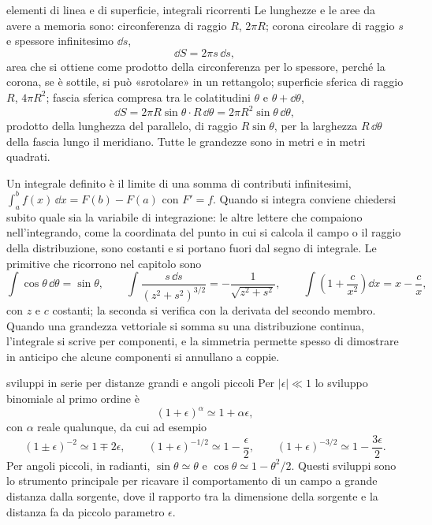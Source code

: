 \documentclass[main.tex]{subfiles}
\begin{document}
\begin{richiamo}{elementi di linea e di superficie, integrali ricorrenti}
Le lunghezze e le aree da avere a memoria sono: circonferenza di raggio $R$, $2\pi R$; corona circolare di raggio $s$ e spessore infinitesimo $\dd s$,
\[
\dd S=2\pi s\,\dd s ,
\]
area che si ottiene come prodotto della circonferenza per lo spessore, perché la corona, se è sottile, si può «srotolare» in un rettangolo; superficie sferica di raggio $R$, $4\pi R^2$; fascia sferica compresa tra le colatitudini $\theta$ e $\theta+\dd\theta$,
\[
\dd S=2\pi R\sin\theta\cdot R\,\dd\theta=2\pi R^2\sin\theta\,\dd\theta ,
\]
prodotto della lunghezza del parallelo, di raggio $R\sin\theta$, per la larghezza $R\,\dd\theta$ della fascia lungo il meridiano. Tutte le grandezze sono in metri e in metri quadrati.

Un integrale definito è il limite di una somma di contributi infinitesimi, $\int_a^b f(x)\,\dd x=F(b)-F(a)$ con $F'=f$. Quando si integra conviene chiedersi subito quale sia la variabile di integrazione: le altre lettere che compaiono nell'integrando, come la coordinata del punto in cui si calcola il campo o il raggio della distribuzione, sono costanti e si portano fuori dal segno di integrale. Le primitive che ricorrono nel capitolo sono
\[
\int\cos\theta\,\dd\theta=\sin\theta,\qquad
\int\frac{s\,\dd s}{(z^2+s^2)^{3/2}}=-\frac{1}{\sqrt{z^2+s^2}},\qquad
\int\left(1+\frac{c}{x^2}\right)\dd x=x-\frac{c}{x},
\]
con $z$ e $c$ costanti; la seconda si verifica con la derivata del secondo membro. Quando una grandezza vettoriale si somma su una distribuzione continua, l'integrale si scrive per componenti, e la simmetria permette spesso di dimostrare in anticipo che alcune componenti si annullano a coppie.
\end{richiamo}

\begin{richiamo}{sviluppi in serie per distanze grandi e angoli piccoli}
Per $|\epsilon|\ll1$ lo sviluppo binomiale al primo ordine è
\[
(1+\epsilon)^{\alpha}\simeq1+\alpha\epsilon ,
\]
con $\alpha$ reale qualunque, da cui ad esempio
\[
(1\pm\epsilon)^{-2}\simeq1\mp2\epsilon,\qquad(1+\epsilon)^{-1/2}\simeq1-\frac{\epsilon}{2},\qquad (1+\epsilon)^{-3/2}\simeq1-\frac{3\epsilon}{2}.
\]
Per angoli piccoli, in radianti, $\sin\theta\simeq\theta$ e $\cos\theta\simeq1-\theta^2/2$. Questi sviluppi sono lo strumento principale per ricavare il comportamento di un campo a grande distanza dalla sorgente, dove il rapporto tra la dimensione della sorgente e la distanza fa da piccolo parametro $\epsilon$.
\end{richiamo}
\end{document}
